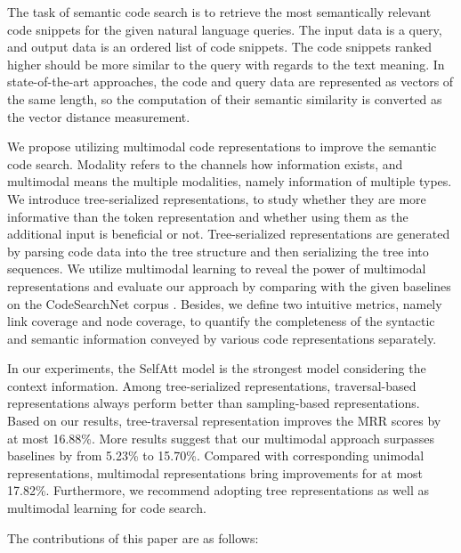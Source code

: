 \documentclass[conference]{IEEEtran}
\begin{document}
The task of semantic code search is to retrieve the most semantically relevant code snippets for the given natural language queries. The input data is a query, and output data is an ordered list of code snippets. The code snippets ranked higher should be more similar to the query with regards to the text meaning. In state-of-the-art approaches, the code and query data are represented as vectors of the same length, so the computation of their semantic similarity is converted as the vector distance measurement.

We propose utilizing multimodal code representations to improve the semantic code search. Modality refers to the channels how information exists, and multimodal means the multiple modalities, namely information of multiple types. We introduce tree-serialized representations, to study whether they are more informative than the token representation and whether using them as the additional input is beneficial or not. Tree-serialized representations are generated by parsing code data into the tree structure and then serializing the tree into sequences. We utilize multimodal learning to reveal the power of multimodal representations and evaluate our approach by comparing with the given baselines on the CodeSearchNet corpus \cite{Husain2019CodeSearchNetCE}. Besides, we define two intuitive metrics, namely link coverage and node coverage, to quantify the completeness of the syntactic and semantic information conveyed by various code representations separately.

In our experiments, the SelfAtt model is the strongest model considering the context information. Among tree-serialized representations, traversal-based representations always perform better than sampling-based representations. Based on our results, tree-traversal representation improves the MRR scores by at most 16.88\%. More results suggest that our multimodal approach surpasses baselines by from 5.23\% to 15.70\%. Compared with corresponding unimodal representations, multimodal representations bring improvements for at most 17.82\%. Furthermore, we recommend adopting tree representations as well as multimodal learning for code search.

The contributions of this paper are as follows:
\end{document}
